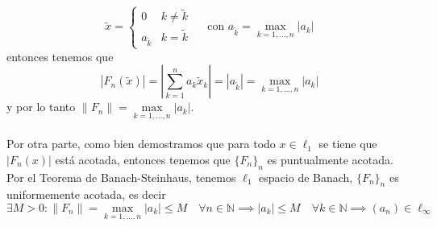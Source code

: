 \begin{ejercicio}
    \begin{equation*}
        \tilde{x} = 
        \begin{cases} 
            0 & k \neq \tilde{k} \\ 
            a_{\tilde{k}} & k = \tilde{k} 
        \end{cases}
        \quad \text{ con } a_{\tilde{k}} = \max_{k=1,\dots,n} |a_k|
    \end{equation*}
    entonces tenemos que 
    $$|F_n(\tilde{x})| = \left|\sum_{k=1}^{n} a_k \tilde{x}_k\right| = |a_{\tilde{k}}| = \max_{k=1,\dots,n} |a_k|$$
    y por lo tanto $\|F_n\| = \max\limits_{k=1,\dots,n} |a_k|$. \\ \\
    \noindent
    Por otra parte, como bien demostramos que para todo $x\in \ell_1$ se tiene que $|F_n(x)|$ está acotada, entonces tenemos que $\{F_n\}_n$ es puntualmente acotada. Por el Teorema de Banach-Steinhaus, tenemos $\ell_1$ espacio de Banach, $\{F_n\}_n$ es uniformemente acotada, es decir
    \begin{equation*}
        \exists M > 0 : \|F_n\| = \max_{k=1,\dots,n} |a_k| \leq M \quad \forall n \in \mathbb{N} \implies |a_k| \leq M \quad \forall k \in \mathbb{N} \implies (a_n) \in \ell_\infty
    \end{equation*}
\end{ejercicio}

